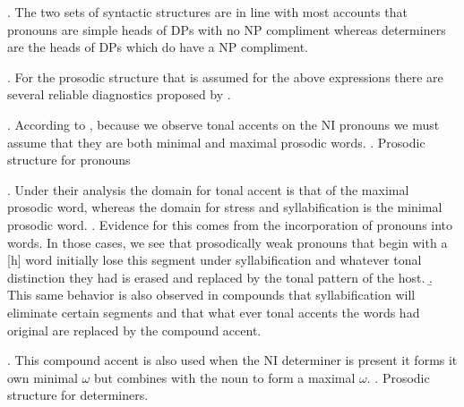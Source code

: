 \documentclass[12pt, letterpaper]{article}
\begin{document}
\ex. The two sets of syntactic structures are in line with most accounts that pronouns are simple heads of DPs with no NP compliment whereas determiners are the heads of DPs which do have a NP compliment.

\ex. For the prosodic structure that is assumed for the above expressions there are several reliable diagnostics proposed by \cite{myrbergProsodicHierarchySwedish2015}.

\ex. According to \cite{myrbergProsodicHierarchySwedish2015}, because we observe tonal accents on the NI pronouns we must assume that they are both minimal and maximal prosodic words. 
	\a. Prosodic structure for pronouns\\

\ex. Under their analysis the domain for tonal accent is that of the maximal prosodic word, whereas the domain for stress and syllabification is the minimal prosodic word. 
	\a. Evidence for this comes from the incorporation of pronouns into words. In those cases, we see that prosodically weak pronouns that begin with a [h] word initially lose this segment under syllabification and whatever tonal distinction they had is erased and replaced by the tonal pattern of the host.	
	\b. This same behavior is also observed in compounds that syllabification will eliminate certain segments and that what ever tonal accents the words had original are replaced by the compound accent. 

\ex. This compound accent is also used when the NI determiner is present it forms it own minimal $\omega$ but combines with the noun to form a maximal $\omega$.
	\a. Prosodic structure for determiners.\\


\end{document}
